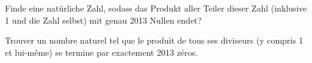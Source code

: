 Finde eine natürliche Zahl, sodass das Produkt aller Teiler dieser Zahl (inklusive 1 und die Zahl selbst) mit genau 2013 Nullen endet?

\bigskip

Trouver un nombre naturel tel que le produit de tous ses diviseurs (y compris 1 et lui-même) se termine par exactement 2013 zéros.